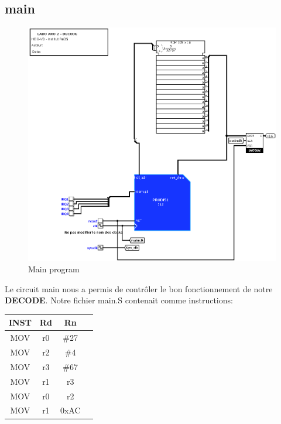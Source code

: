 \documentclass[a4paper]{article} %
\begin{document}
\subsection{main}
\begin{figure}[H]
    \centering
    \includegraphics[width=1\textwidth]{src/main.png}
    \caption{Main program}
    \label{main_img}
\end{figure}

Le circuit main nous a permis de contrôler le bon fonctionnement de notre \textbf{DECODE}. Notre fichier main.S contenait comme instructions:\\

\begin{tabular}{|c|c|c|c|}    
    \hline
    INST & Rd & Rn \\
    \hline
    MOV  & r0 & \#27    \\
    \hline
    MOV  & r2 & \#4    \\
    \hline
    MOV  & r3 & \#67    \\
    \hline
    MOV  & r1 & r3  \\
    \hline
    MOV  & r0 & r2 \\
    \hline
    MOV  & r1 & 0xAC    \\
    \hline
\end{tabular}
\end{document}
